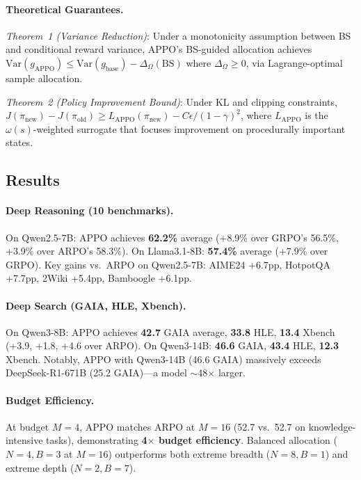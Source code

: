 \documentclass[11pt,a4paper]{article}
\begin{document}
\paragraph{Theoretical Guarantees.} \emph{Theorem~1 (Variance Reduction)}: Under a monotonicity assumption between BS and conditional reward variance, APPO's BS-guided allocation achieves $\mathrm{Var}(g_{\mathrm{APPO}}) \leq \mathrm{Var}(g_{\mathrm{base}}) - \Delta_\Omega(\mathrm{BS})$ where $\Delta_\Omega \geq 0$, via Lagrange-optimal sample allocation.

\emph{Theorem~2 (Policy Improvement Bound)}: Under KL and clipping constraints, $J(\pi_{\mathrm{new}}) - J(\pi_{\mathrm{old}}) \geq L_{\mathrm{APPO}}(\pi_{\mathrm{new}}) - C\epsilon/(1\!-\!\gamma)^2$, where $L_{\mathrm{APPO}}$ is the $\omega(s)$-weighted surrogate that focuses improvement on procedurally important states.

\subsection{Results}

\paragraph{Deep Reasoning (10 benchmarks).} On Qwen2.5-7B: APPO achieves \textbf{62.2\%} average (+8.9\% over GRPO's 56.5\%, +3.9\% over ARPO's 58.3\%). On Llama3.1-8B: \textbf{57.4\%} average (+7.9\% over GRPO). Key gains vs.\ ARPO on Qwen2.5-7B: AIME24 +6.7pp, HotpotQA +7.7pp, 2Wiki +5.4pp, Bamboogle +6.1pp.

\paragraph{Deep Search (GAIA, HLE, Xbench).} On Qwen3-8B: APPO achieves \textbf{42.7} GAIA average, \textbf{33.8} HLE, \textbf{13.4} Xbench (+3.9, +1.8, +4.6 over ARPO). On Qwen3-14B: \textbf{46.6} GAIA, \textbf{43.4} HLE, \textbf{12.3} Xbench. Notably, APPO with Qwen3-14B (46.6 GAIA) massively exceeds DeepSeek-R1-671B (25.2 GAIA)---a model $\sim$48$\times$ larger.

\paragraph{Budget Efficiency.} At budget $M\!=\!4$, APPO matches ARPO at $M\!=\!16$ (52.7 vs.\ 52.7 on knowledge-intensive tasks), demonstrating \textbf{4$\times$ budget efficiency}. Balanced allocation ($N\!=\!4, B\!=\!3$ at $M\!=\!16$) outperforms both extreme breadth ($N\!=\!8, B\!=\!1$) and extreme depth ($N\!=\!2, B\!=\!7$).
\end{document}
